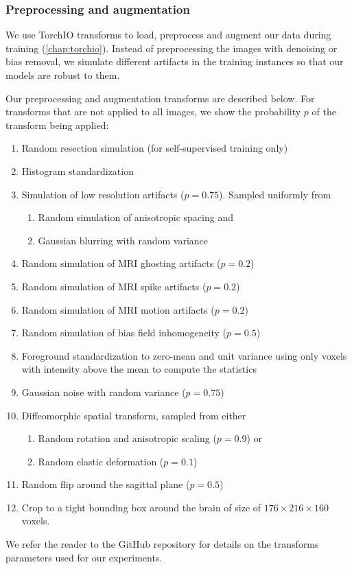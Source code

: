 \subsubsection{Preprocessing and augmentation}
\label{sec:preprocessing_augmentation}

We use TorchIO transforms to load, preprocess and augment our data during training \cite{perez-garcia_torchio_2021} (\cref{chap:torchio}).
Instead of preprocessing the images with denoising or bias removal, we simulate different artifacts in the training instances so that our models are robust to them.

Our preprocessing and augmentation transforms are described below.
For transforms that are not applied to all images, we show the probability $p$ of the transform being applied:

\begin{enumerate}
    \item Random resection simulation (for self-supervised training only)
    \item Histogram standardization \cite{nyul_new_2000}
    \item Simulation of low resolution artifacts ($p = 0.75$). Sampled uniformly from
    \begin{enumerate}
        \item Random simulation of anisotropic spacing \cite{billot_partial_2020} and
        \item Gaussian blurring with random variance
    \end{enumerate}
    \item Random simulation of MRI ghosting artifacts \cite{shaw_heteroscedastic_2020} ($p = 0.2$)
    \item Random simulation of MRI spike artifacts \cite{shaw_heteroscedastic_2020} ($p = 0.2$)
    \item Random simulation of MRI motion artifacts \cite{shaw_mri_2019} ($p = 0.2$)
    \item Random simulation of bias field inhomogeneity \cite{sudre_longitudinal_2017} ($p = 0.5$)
    \item Foreground standardization to zero-mean and unit variance using only voxels with intensity above the mean to compute the statistics
    \item Gaussian noise with random variance ($p = 0.75$)
    \item Diffeomorphic spatial transform, sampled from either
    \begin{enumerate}
        \item Random rotation and anisotropic scaling ($p = 0.9$) or
        \item Random elastic deformation ($p = 0.1$)
    \end{enumerate}
    \item Random flip around the sagittal plane ($p = 0.5$)
    \item Crop to a tight bounding box around the brain of size of $176 \times 216 \times 160$ voxels.
\end{enumerate}

We refer the reader to the GitHub repository for details on the transforms parameters used for our experiments.
